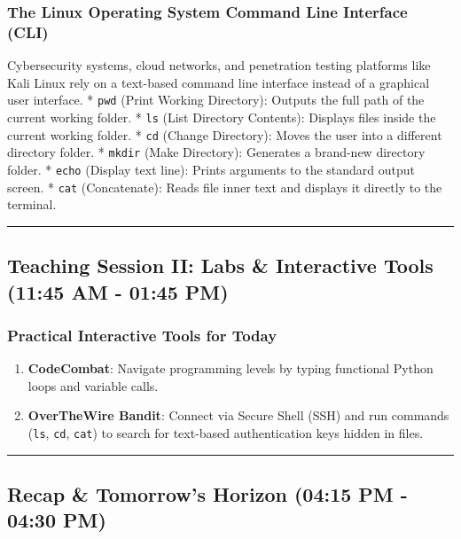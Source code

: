 \documentclass[12pt,openany]{book}
\begin{document}
\subsubsection*{The Linux Operating System Command Line Interface (CLI)}


Cybersecurity systems, cloud networks, and penetration testing platforms like Kali Linux rely on a text-based command line interface instead of a graphical user interface.
* \texttt{pwd} (Print Working Directory): Outputs the full path of the current working folder.
* \texttt{ls} (List Directory Contents): Displays files inside the current working folder.
* \texttt{cd} (Change Directory): Moves the user into a different directory folder.
* \texttt{mkdir} (Make Directory): Generates a brand-new directory folder.
* \texttt{echo} (Display text line): Prints arguments to the standard output screen.
* \texttt{cat} (Concatenate): Reads file inner text and displays it directly to the terminal.


\medskip\noindent\rule{\linewidth}{0.4pt}\medskip

\medskip

\subsection*{Teaching Session II: Labs \& Interactive Tools (11:45 AM - 01:45 PM)}


\subsubsection*{Practical Interactive Tools for Today}


\begin{enumerate}

  \item \textbf{CodeCombat}: Navigate programming levels by typing functional Python loops and variable calls.

  \item \textbf{OverTheWire Bandit}: Connect via Secure Shell (SSH) and run commands (\texttt{ls}, \texttt{cd}, \texttt{cat}) to search for text-based authentication keys hidden in files.

\end{enumerate}


\medskip\noindent\rule{\linewidth}{0.4pt}\medskip

\medskip

\subsection*{Recap \& Tomorrow's Horizon (04:15 PM - 04:30 PM)}
\end{document}
